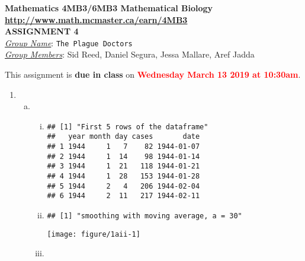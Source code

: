 \documentclass[12pt]{article}\usepackage[]{graphicx}\usepackage[]{color}
\makeatletter
\def\maxwidth{ %
  \ifdim\Gin@nat@width>\linewidth
    \linewidth
  \else
    \Gin@nat@width
  \fi
}
\newenvironment{kframe}{%
 \def\at@end@of@kframe{}%
 \ifinner\ifhmode%
  \def\at@end@of@kframe{\end{minipage}}%
  \begin{minipage}{\columnwidth}%
 \fi\fi%
 \def\FrameCommand##1{\hskip\@totalleftmargin \hskip-\fboxsep
 \colorbox{shadecolor}{##1}\hskip-\fboxsep
     \hskip-\linewidth \hskip-\@totalleftmargin \hskip\columnwidth}%
 \MakeFramed {\advance\hsize-\width
   \@totalleftmargin\z@ \linewidth\hsize
   \@setminipage}}%
 {\par\unskip\endMakeFramed%
 \at@end@of@kframe}
\newenvironment{knitrout}{}{} %
\makeatother
\begin{document}
\begin{center}
{\bf Mathematics 4MB3/6MB3 Mathematical Biology\\
\smallskip
\url{http://www.math.mcmaster.ca/earn/4MB3}\\
 ASSIGNMENT 4}\\
\medskip
\underline{\emph{Group Name}}: \texttt{{\color{blue}The Plague Doctors}}\\
\medskip
\underline{\emph{Group Members}}: {\color{blue}Sid Reed, Daniel Segura, Jessa Mallare, Aref Jadda}
\end{center}

\bigskip
\noindent
This assignment is {\bfseries\color{red} due in class} on \textcolor{red}{\bf Wednesday March 13 2019 at 10:30am}.
\bigskip
\begin{enumerate}
    \item %
    \begin{enumerate}[(a)]
        \item \TSa
        \begin{enumerate}[(i)]
            \item

\begin{knitrout}
\color{fgcolor}\begin{kframe}
\begin{verbatim}
## [1] "First 5 rows of the dataframe"
##   year month day cases       date
## 1 1944     1   7    82 1944-01-07
## 2 1944     1  14    98 1944-01-14
## 3 1944     1  21   118 1944-01-21
## 4 1944     1  28   153 1944-01-28
## 5 1944     2   4   206 1944-02-04
## 6 1944     2  11   217 1944-02-11
\end{verbatim}
\end{kframe}
\end{knitrout}

            \item

\begin{knitrout}
\color{fgcolor}\begin{kframe}
\begin{verbatim}
## [1] "smoothing with moving average, a = 30"
\end{verbatim}
\end{kframe}
\texttt{[image: figure/1aii-1]} 

\end{knitrout}
            \item


\end{enumerate}
\end{enumerate}
\end{enumerate}
\end{document}
